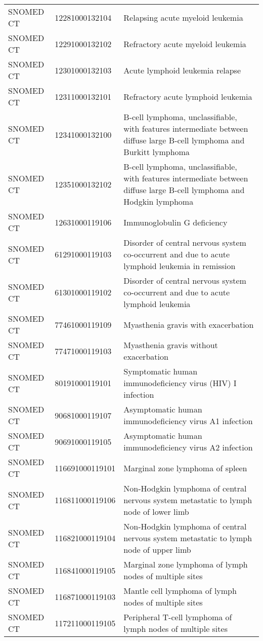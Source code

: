 \begin{longtable}{p{}p{}p{}}
  SNOMED CT & 12281000132104 & Relapsing acute myeloid leukemia \\ 
  SNOMED CT & 12291000132102 & Refractory acute myeloid leukemia \\ 
  SNOMED CT & 12301000132103 & Acute lymphoid leukemia relapse \\ 
  SNOMED CT & 12311000132101 & Refractory acute lymphoid leukemia \\ 
  SNOMED CT & 12341000132100 & B-cell lymphoma, unclassifiable, with features intermediate between diffuse large B-cell lymphoma and Burkitt lymphoma \\ 
  SNOMED CT & 12351000132102 & B-cell lymphoma, unclassifiable, with features intermediate between diffuse large B-cell lymphoma and Hodgkin lymphoma \\ 
  SNOMED CT & 12631000119106 & Immunoglobulin G deficiency \\ 
  SNOMED CT & 61291000119103 & Disorder of central nervous system co-occurrent and due to acute lymphoid leukemia in remission \\ 
  SNOMED CT & 61301000119102 & Disorder of central nervous system co-occurrent and due to acute lymphoid leukemia \\ 
  SNOMED CT & 77461000119109 & Myasthenia gravis with exacerbation \\ 
  SNOMED CT & 77471000119103 & Myasthenia gravis without exacerbation \\ 
  SNOMED CT & 80191000119101 & Symptomatic human immunodeficiency virus (HIV) I infection \\ 
  SNOMED CT & 90681000119107 & Asymptomatic human immunodeficiency virus A1 infection \\ 
  SNOMED CT & 90691000119105 & Asymptomatic human immunodeficiency virus A2 infection \\ 
  SNOMED CT & 116691000119101 & Marginal zone lymphoma of spleen \\ 
  SNOMED CT & 116811000119106 & Non-Hodgkin lymphoma of central nervous system metastatic to lymph node of lower limb \\ 
  SNOMED CT & 116821000119104 & Non-Hodgkin lymphoma of central nervous system metastatic to lymph node of upper limb \\ 
  SNOMED CT & 116841000119105 & Marginal zone lymphoma of lymph nodes of multiple sites \\ 
  SNOMED CT & 116871000119103 & Mantle cell lymphoma of lymph nodes of multiple sites \\ 
  SNOMED CT & 117211000119105 & Peripheral T-cell lymphoma of lymph nodes of multiple sites \\ 

\end{longtable}
